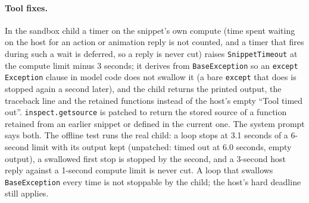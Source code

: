 \paragraph{Tool fixes.}
In the sandbox child a timer on the snippet's own compute (time spent waiting on the host for an action or animation reply is not counted, and a timer that fires during such a wait is deferred, so a reply is never cut) raises \texttt{SnippetTimeout} at the compute limit minus 3 seconds; it derives from \texttt{BaseException} so an \texttt{except Exception} clause in model code does not swallow it (a bare \texttt{except} that does is stopped again a second later), and the child returns the printed output, the traceback line and the retained functions instead of the host's empty ``Tool timed out''. %
\texttt{inspect.getsource} is patched to return the stored source of a function retained from an earlier snippet or defined in the current one. The system prompt says both. %
The offline test runs the real child: a loop stops at 3.1 seconds of a 6-second limit with its output kept (unpatched: timed out at 6.0 seconds, empty output), a swallowed first stop is stopped by the second, and a 3-second host reply against a 1-second compute limit is never cut. A loop that swallows \texttt{BaseException} every time is not stoppable by the child; the host's hard deadline still applies. %

